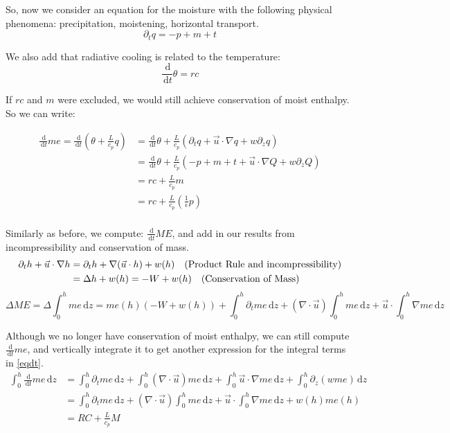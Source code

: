 \documentclass[10pt]{article}
\newcommand{\rmd}{\,\mathrm{d}}
\begin{document}
So, now we consider an equation for the moisture with the following physical phenomena: precipitation, moistening, horizontal transport.
\begin{equation}
\partial_t q = -p + m + t
\end{equation}

We also add that radiative cooling is related to the temperature: 
\begin{equation}
\frac{\rmd}{\rmd t}\theta = rc
\end{equation}

If $rc$ and $m$ were excluded, we would still achieve conservation of moist enthalpy. So we can write:

\begin{align*}
\frac{\rmd}{\rmd t} me = \frac{\rmd}{\rmd t}\left(\theta + \frac{L}{c_p}q\right) &= \frac{\rmd}{\rmd t}\theta + \frac{L}{c_p}\left(\partial_t q + \vec{u}\cdot \nabla q + w\partial_z q\right) \\
&= \frac{\rmd}{\rmd t}\theta + \frac{L}{c_p}\left(-p + m + t+ \vec{u}\cdot \nabla Q + w\partial_z Q\right) \\
&= rc +\frac{L}{c_p} m \\
&= rc +\frac{L}{c_p} \left(\frac{1}{\epsilon} p\right) \\
\end{align*}

Similarly as before, we compute: $\frac{\rmd}{\rmd t} ME $, and add in our results from incompressibility and conservation of mass.
\begin{align*}
 \partial_t h +\vec{u}\cdot \nabla h &= \partial_t h +\nabla(\vec{u}\cdot h) + w(h) \text{\quad (Product Rule and incompressibility)}\\
 &= \Delta h + w(h) = -W + w(h)\text{\quad (Conservation of Mass) }
 \end{align*}
 \begin{equation}
\Delta ME = \Delta \int_{0}^{h} me \rmd z= me(h)\left( -W + w(h) \right) + \int_{0}^{h} \partial_tme \rmd z + \left(\nabla \cdot\vec{u} \right)\int_{0}^{h} me \rmd z + \vec{u}\cdot \int_{0}^{h}\nabla me \rmd z 
 \label{eqdt}
\end{equation}
  
 Although we no longer have conservation of moist enthalpy, we can still compute $\frac{\rmd}{\rmd t} me$, and vertically integrate it to get another expression for the integral terms in \ref{eqdt}.  
\begin{align}
\int_{0}^{h} \frac{\rmd}{\rmd t} me \rmd z &= \int_{0}^{h} \partial_t me \rmd z + \int_{0}^{h} (\nabla \cdot \vec{u}) me \rmd z + \int_{0}^{h} \vec{u} \cdot \nabla me \rmd z + \int_{0}^{h} \partial_z (w me) \rmd z \\
&= \int_{0}^{h} \partial_t me \rmd z + (\nabla \cdot \vec{u})\int_{0}^{h}  me \rmd z + \vec{u} \cdot \int_{0}^{h} \nabla me \rmd z + w(h)me(h) \\
&= RC + \frac{L}{c_p} M \label{eq4}
\end{align}
\end{document}
